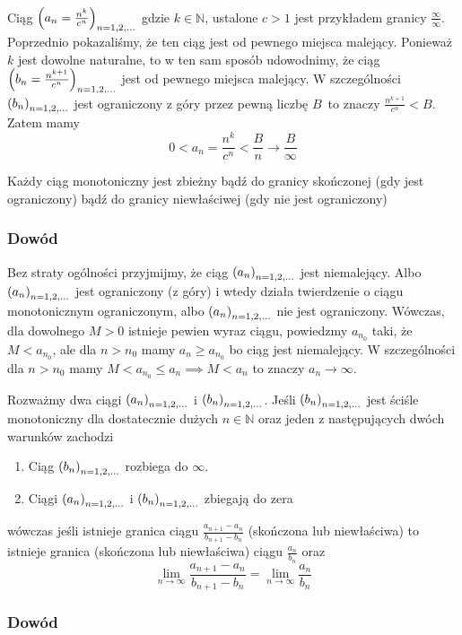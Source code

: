 \documentclass[9pt]{article}
\begin{document}
Ciąg $\left(a_n = \frac{n^k}{c^n}\right)_{n = 1,2,...}$ gdzie $k \in \mathbb{N}$, ustalone $c > 1$ jest przykładem
granicy $\frac{\infty}{\infty}$. Poprzednio pokazaliśmy, że ten ciąg jest od pewnego miejsca
malejący. Ponieważ $k$ jest dowolne naturalne, to w ten sam sposób udowodnimy, że ciąg $\left(b_n =
\frac{n^{k+1}}{c^n}\right)_{n = 1,2,...}$ jest od pewnego miejsca malejący. W szczególności $\left(b_n\right)_{n = 1,2,...}$ jest ograniczony
z góry przez pewną liczbę $B$ to znaczy $\frac{n^{k+1}}{c^n} < B$. Zatem mamy 
\[
    0 < a_n = \frac{n^k}{c^n} < \frac{B}{n} \to \frac{B}{\infty}
\]

\begin{Twi}
    Każdy ciąg monotoniczny jest zbieżny bądź do granicy skończonej (gdy jest ograniczony) bądź do
    granicy niewłaściwej (gdy nie jest ograniczony)
\end{Twi}

\subsubsection*{Dowód}
Bez straty ogólności przyjmijmy, że ciąg $\left(a_n\right)_{n = 1,2,...}$ jest niemalejący. Albo $\left(a_n\right)_{n = 1,2,...}$ jest
ograniczony (z góry) i wtedy działa twierdzenie o ciągu monotonicznym ograniczonym, albo $\left(a_n\right)_{n = 1,2,...}$
nie jest ograniczony. Wówczas, dla dowolnego $M > 0$ istnieje pewien wyraz ciągu, powiedzmy
$a_{n_0}$ taki, że $M < a_{n_0}$, ale dla $n > n_0$ mamy $a_n \ge a_{n_0}$ bo ciąg jest niemalejący.
W szczególności dla $n > n_0$ mamy $M < a_{n_0} \le a_n \implies M < a_n$ to znaczy $a_n \to
\infty$.

\begin{Twi}[Stolza]
    Rozważmy dwa ciągi $\left(a_n\right)_{n = 1,2,...}$ i $\left(b_n\right)_{n = 1,2,...}$. Jeśli $\left(b_n\right)_{n = 1,2,...}$ jest ściśle monotoniczny dla
    dostatecznie dużych $n \in \mathbb{N}$ oraz jeden z następujących dwóch warunków zachodzi
    \begin{enumerate}
        \item Ciąg $\left(b_n\right)_{n = 1,2,...}$ rozbiega do $\infty$.
        \item Ciągi $\left(a_n\right)_{n = 1,2,...}$ i $\left(b_n\right)_{n = 1,2,...}$ zbiegają do zera
    \end{enumerate}
    wówczas jeśli istnieje granica ciągu $\frac{a_{n+1}-a_n}{b_{n+1}-b_n}$ (skończona lub
    niewłaściwa) to istnieje granica (skończona lub niewłaściwa) ciągu $\frac{a_n}{b_n}$ oraz
    \[
        \lim_{n \to \infty} \frac{a_{n+1}-a_n}{b_{n+1}-b_n} = \lim_{n \to \infty} \frac{a_n}{b_n}
    \]
\end{Twi}

\subsubsection*{Dowód}
\end{document}
